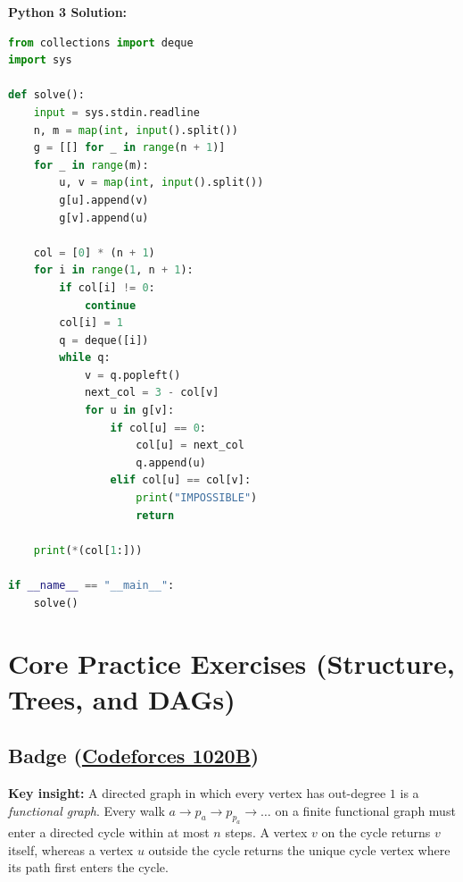 \documentclass[11pt]{article}
\newcommand{\insight}[1]{\par\medskip\noindent\textbf{Key insight:} #1\par\smallskip}
\begin{document}
\textbf{Python 3 Solution:}
\begin{lstlisting}[language=Python]
from collections import deque
import sys

def solve():
    input = sys.stdin.readline
    n, m = map(int, input().split())
    g = [[] for _ in range(n + 1)]
    for _ in range(m):
        u, v = map(int, input().split())
        g[u].append(v)
        g[v].append(u)

    col = [0] * (n + 1)
    for i in range(1, n + 1):
        if col[i] != 0:
            continue
        col[i] = 1
        q = deque([i])
        while q:
            v = q.popleft()
            next_col = 3 - col[v]
            for u in g[v]:
                if col[u] == 0:
                    col[u] = next_col
                    q.append(u)
                elif col[u] == col[v]:
                    print("IMPOSSIBLE")
                    return

    print(*(col[1:]))

if __name__ == "__main__":
    solve()
\end{lstlisting}

\section{Core Practice Exercises (Structure, Trees, and DAGs)}

\subsection{Badge (\href{https://codeforces.com/contest/1020/problem/B}{Codeforces 1020B})}

\insight{A directed graph in which every vertex has out-degree $1$ is a \emph{functional graph}. Every walk $a \to p_a \to p_{p_a} \to \dots$ on a finite functional graph must enter a directed cycle within at most $n$ steps. A vertex $v$ on the cycle returns $v$ itself, whereas a vertex $u$ outside the cycle returns the unique cycle vertex where its path first enters the cycle.}
\end{document}
